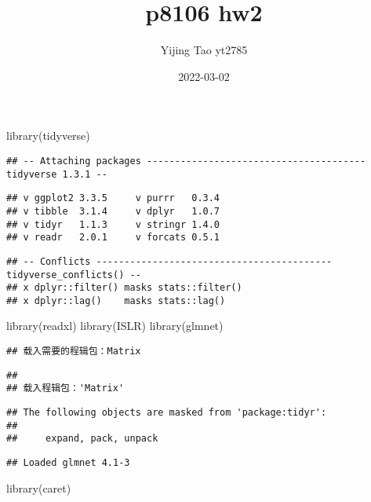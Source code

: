 \documentclass[
]{article}
\title{p8106 hw2}
\author{Yijing Tao yt2785}
\date{2022-03-02}
\newenvironment{Shaded}{\begin{snugshade}}{\end{snugshade}}
\newcommand{\FunctionTok}[1]{\textcolor[rgb]{0.00,0.00,0.00}{#1}}
\newcommand{\NormalTok}[1]{#1}
\begin{document}
\maketitle

\begin{Shaded}
\begin{Highlighting}[]
\FunctionTok{library}\NormalTok{(tidyverse)}
\end{Highlighting}
\end{Shaded}

\begin{verbatim}
## -- Attaching packages --------------------------------------- tidyverse 1.3.1 --
\end{verbatim}

\begin{verbatim}
## v ggplot2 3.3.5     v purrr   0.3.4
## v tibble  3.1.4     v dplyr   1.0.7
## v tidyr   1.1.3     v stringr 1.4.0
## v readr   2.0.1     v forcats 0.5.1
\end{verbatim}

\begin{verbatim}
## -- Conflicts ------------------------------------------ tidyverse_conflicts() --
## x dplyr::filter() masks stats::filter()
## x dplyr::lag()    masks stats::lag()
\end{verbatim}

\begin{Shaded}
\begin{Highlighting}[]
\FunctionTok{library}\NormalTok{(readxl)}
\FunctionTok{library}\NormalTok{(ISLR)}
\FunctionTok{library}\NormalTok{(glmnet)}
\end{Highlighting}
\end{Shaded}

\begin{verbatim}
## 载入需要的程辑包：Matrix
\end{verbatim}

\begin{verbatim}
## 
## 载入程辑包：'Matrix'
\end{verbatim}

\begin{verbatim}
## The following objects are masked from 'package:tidyr':
## 
##     expand, pack, unpack
\end{verbatim}

\begin{verbatim}
## Loaded glmnet 4.1-3
\end{verbatim}

\begin{Shaded}
\begin{Highlighting}[]
\FunctionTok{library}\NormalTok{(caret)}
\end{Highlighting}
\end{Shaded}
\end{document}
